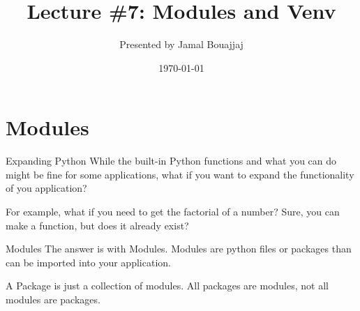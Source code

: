 %
%



\title{Lecture \#7: Modules and Venv}
\date{\today}
\author{Presented by Jamal Bouajjaj}

\makeatletter
{}%
\makeatother



\maketitle

\section{Modules}

\begin{frame}{Expanding Python}
  While the built-in Python functions and what you can do might be fine for some applications, what if you want to expand the functionality of you application?

  For example, what if you need to get the factorial of a number? Sure, you can make a function, but does it already exist?
\end{frame}

\begin{frame}{Modules}
  The answer is with Modules. Modules are python files or packages than can be imported into your application.

  A Package is just a collection of modules. All packages are modules, not all modules are packages.
\end{frame}

